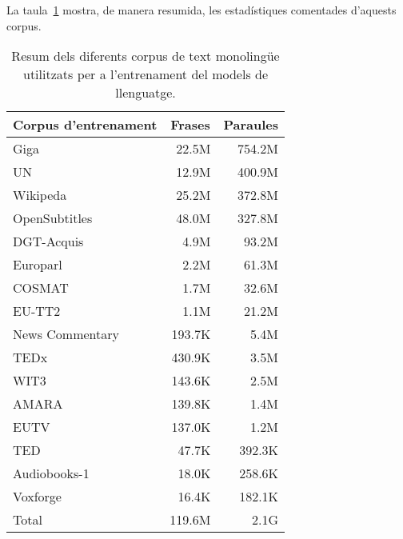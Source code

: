 La taula~\ref{tab:text_corpora} mostra, de manera resumida, les estadístiques comentades d'aquests corpus.

\begin{table}[ht!]
    \centering
    \caption{Resum dels diferents corpus de text monolingüe utilitzats per a l'entrenament del models de llenguatge.}
    \begin{tabular}{l|r|r}
        \multicolumn{1}{c|}{Corpus d'entrenament}	&	\multicolumn{1}{c}{Frases} &	\multicolumn{1}{|c}{Paraules}	\\
        \hline
        Giga									&	22.5M							&	754.2M							    \\
        UN										&	12.9M							&	400.9M							    \\
        Wikipeda								&	25.2M							&	372.8M							    \\
        OpenSubtitles							&	48.0M							&	327.8M							    \\
        DGT-Acquis								&	4.9M							&	93.2M								\\
        Europarl								&	2.2M							&	61.3M								\\
        COSMAT									&	1.7M							&	32.6M								\\
        EU-TT2									&	1.1M							&	21.2M								\\
        News Commentary							&	193.7K						    &	5.4M								\\
        TEDx									&	430.9K						    &	3.5M								\\
        WIT3									&	143.6K						    &	2.5M								\\
        AMARA									&	139.8K						    &	1.4M								\\
        EUTV									&	137.0K						    &	1.2M								\\
        TED										&	47.7K							&	392.3K							    \\
        Audiobooks-1							&	18.0K							&	258.6K							    \\
        Voxforge								&	16.4K							&	182.1K							    \\
        \hline
        Total									&	119.6M						    &	2.1G								\\
    \end{tabular}
    \label{tab:text_corpora}
\end{table}
